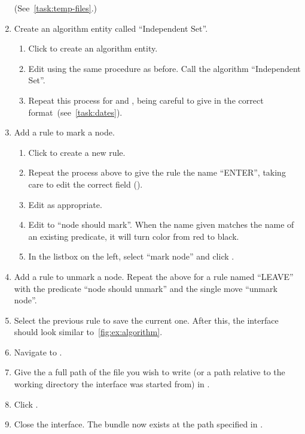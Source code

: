 \begin{enumerate}
  (See~\autoref{task:temp-files}.)
\item Create an algorithm entity called \enquote{Independent Set}.
\begin{enumerate}
\item Click  to create an algorithm entity.
\item Edit  using the same procedure as before.
  Call the algorithm \enquote{Independent Set}.
\item Repeat this process for  and ,
  being careful to give  in the correct format~(see~\autoref{task:dates}).
\end{enumerate}
\item Add a rule to mark a node.
  \begin{enumerate}
  \item Click  to create a new rule.
  \item Repeat the process above to give the rule the name
    \enquote{ENTER}, taking care to edit the correct field
    ().
  \item Edit  as appropriate.
  \item Edit  to \enquote{node
      should mark}.  When the name given matches the name of an
    existing predicate, it will turn color from red to black.
  \item In the listbox on the left, select \enquote{mark node} and
    click .
  \end{enumerate}
\item Add a rule to unmark a node.  Repeat the above for a rule named
  \enquote{LEAVE} with the predicate \enquote{node should unmark} and
  the single move \enquote{unmark node}.
\item Select the previous rule to save the current one.
  After this, the interface should look similar to~\autoref{fig:ex:algorithm}.
\item Navigate to .
\item Give the a full path of the file you wish to write
  (or a path relative to the working directory the interface was started from)
  in .
\item Click .
\item Close the interface.
  The bundle now exists at the path specified in .
\end{enumerate}

